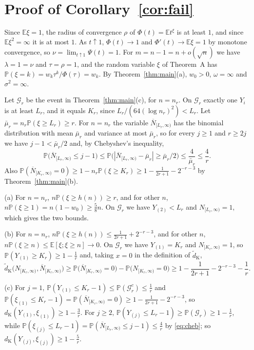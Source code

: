 \documentclass[11pt]{amsart}
\numberwithin{equation}{section}
\newcommand{\Pp}{\mathbb P}
\newcommand{\E}{\mathbb E}
\newcommand{\cG}{\mathcal G}
\newcommand{\Nb}{\overline N}
\newcommand{\dK}{d_{\mathrm K}}
\newcommand{\tdK}{\widetilde d_{\mathrm K}}
\begin{document}
\section{Proof of Corollary~\ref{cor:fail}}\label{sec:cor}

Since $\E\xi=1$, the radius of convergence $\rho$ of $\Phi(t)=\E t^\xi$ is at least $1$, and since $\E\xi^2=\infty$ it is at most $1$. As $t\uparrow1$, $\Phi(t)\to1$ and $\Phi'(t)\to\E\xi=1$ by monotone convergence, so $\nu=\lim_{t\uparrow1}\Psi(t)=1$. For $m=n-1=n+o(\sqrt n)$ we have $\lambda=1=\nu$ and $\tau=\rho=1$, and the random variable $\xi$ of Theorem~A has $\Pp(\xi=k)=w_k\tau^k/\Phi(\tau)=w_k$. By Theorem~\ref{thm:main}(a), $w_0>0$, $\omega=\infty$ and $\sigma^2=\infty$.

Let $\cG_r$ be the event in Theorem~\ref{thm:main}(c), for $n=n_r$. On $\cG_r$ exactly one $Y_i$ is at least $L_r$, and it equals $K_r$, since $L_r/(64(\log n_r)^2)<L_r$. Let $\bar\mu_r=n_r\Pp(\xi\ge L_r)\ge r$. For $n=n_r$ the variable $\Nb_{[L_r,\infty)}$ has the binomial distribution with mean $\bar\mu_r$ and variance at most $\bar\mu_r$, so for every $j\ge1$ and $r\ge2j$ we have $j-1<\bar\mu_r/2$ and, by Chebyshev's inequality,
\begin{equation}\label{eq:cheb}
\Pp\bigl(\Nb_{[L_r,\infty)}\le j-1\bigr)\le\Pp\bigl(|\Nb_{[L_r,\infty)}-\bar\mu_r|\ge\bar\mu_r/2\bigr)\le\frac4{\bar\mu_r}\le\frac4r.
\end{equation}
Also $\Pp(\Nb_{[K_r,\infty)}=0)\ge1-n_r\Pp(\xi\ge K_r)\ge1-\frac1{2r+1}-2^{-r-3}$ by Theorem~\ref{thm:main}(b).

(a) For $n=n_r$, $n\Pp(\xi\ge h(n))\ge r$, and for other $n$, $n\Pp(\xi\ge1)=n(1-w_0)\ge\frac58n$. On $\cG_r$ we have $Y_{(2)}<L_r$ and $N_{[L_r,\infty)}=1$, which gives the two bounds.

(b) For $n=n_r$, $n\Pp(\xi\ge h(n))\le\frac1{2r+1}+2^{-r-3}$, and for other $n$, $n\Pp(\xi\ge n)\le\E[\xi;\xi\ge n]\to0$. On $\cG_r$ we have $Y_{(1)}=K_r$ and $N_{[K_r,\infty)}=1$, so $\Pp(Y_{(1)}\ge K_r)\ge1-\frac1r$ and, taking $x=0$ in the definition of $\tdK$,
\[
\tdK\bigl(N_{[K_r,\infty)},\Nb_{[K_r,\infty)}\bigr)\ge\Pp\bigl(\Nb_{[K_r,\infty)}=0\bigr)-\Pp\bigl(N_{[K_r,\infty)}=0\bigr)\ge1-\frac1{2r+1}-2^{-r-3}-\frac1r.
\]

(c) For $j=1$, $\Pp(Y_{(1)}\le K_r-1)\le\Pp(\cG_r^c)\le\frac1r$ and $\Pp(\xi_{(1)}\le K_r-1)=\Pp(\Nb_{[K_r,\infty)}=0)\ge1-\frac1{2r+1}-2^{-r-3}$, so $\dK(Y_{(1)},\xi_{(1)})\ge1-\frac3r$. For $j\ge2$, $\Pp(Y_{(j)}\le L_r-1)\ge\Pp(\cG_r)\ge1-\frac1r$, while $\Pp(\xi_{(j)}\le L_r-1)=\Pp(\Nb_{[L_r,\infty)}\le j-1)\le\frac4r$ by \eqref{eq:cheb}; so $\dK(Y_{(j)},\xi_{(j)})\ge1-\frac5r$.
\end{document}
